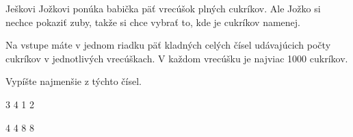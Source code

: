 




Ješkovi Jožkovi ponúka babička päť vrecúšok plných cukríkov.
Ale Jožko si nechce pokaziť zuby, takže si chce vybrať to, kde je cukríkov namenej.


Na vstupe máte v jednom riadku päť kladných celých čísel 
udávajúcich počty cukríkov v jednotlivých vrecúškach.
V každom vrecúšku je najviac 1000 cukríkov.

Vypíšte najmenšie z týchto čísel.


 3 4 1 2
\koniec

 4 4 8 8 
\koniec


